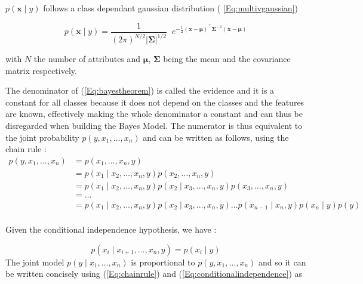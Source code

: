 \documentclass{article}
\begin{document}
\noindent $p(\boldsymbol{x} \mid y)$ follows a class dependant gaussian distribution ( \ref{Eq:multivgaussian})

\noindent 
\begin{equation}
    p(\boldsymbol{x} \mid y)={\frac {1}{(2\pi )^{N/2}\left|{\boldsymbol {\Sigma }}\right|^{1/2}}}\;\;e^{-{\frac {1}{2}}\left({\boldsymbol {x}}-{\boldsymbol {\mu }}\right)^{\top }{\boldsymbol {\Sigma }}^{-1}\left({\boldsymbol {x}}-{\boldsymbol {\mu }}\right)}
    \label{Eq:multivgaussian}
\end{equation}

\noindent with $N$ the number of attributes and $\boldsymbol{\mu}$, $\boldsymbol{\Sigma}$ being the mean and the covariance matrix respectively.


\noindent 
The denominator of (\ref{Eq:bayestheorem}) is called the evidence and it is a constant for all classes because it does not depend on the classes and the features are known, effectively making the whole denominator a constant and can thus be disregarded when building the Bayes Model.
The numerator is thus equivalent to the joint probability $p(y, x_{1},\dots , x_{n})$ and can be written as follows, using the chain rule :
\begin{equation}
 \begin{aligned}
p(y, x_{1},\dots , x_{n}) &=p(x_{1},\dots ,x_{n},y)\\
 &=p(x_{1}\mid x_{2},\dots ,x_{n},y)p(x_{2},\dots ,x_{n},y)\\
 &=p(x_{1}\mid x_{2},\dots ,x_{n},y)p(x_{2}\mid x_{3},\dots ,x_{n},y)p(x_{3},\dots ,x_{n},y)\\
 &=\dots \\
 &=p(x_{1}\mid x_{2},\dots ,x_{n},y)p(x_{2}\mid x_{3},\dots ,x_{n},y)\dots p(x_{n-1}\mid x_{n},y)p(x_{n}\mid y)p(y) \\
 \end{aligned}
 \label{Eq:chainrule}
\end{equation}

\noindent Given the conditional independence hypothesis, we have :

\begin{equation}
    p(x_{i}\mid x_{i+1},\dots ,x_{n},y)=p(x_{i}\mid y)
    \label{Eq:conditionalindependence}
\end{equation}
The joint model $p(y \mid x_{1},\dots , x_{n})$  is proportional to $p(y, x_{1},\dots , x_{n})$ and so it can be written concisely using (\ref{Eq:chainrule}) and (\ref{Eq:conditionalindependence})  as
\end{document}
